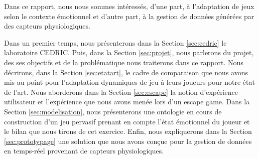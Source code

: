 \documentclass{article}
\begin{document}
	Dans ce rapport, nous nous sommes intéressés, d'une part, à l'adaptation de jeux selon le contexte émotionnel et d'autre part, à la gestion de données générées par des capteurs physiologiques.\par
	Dans un premier temps, nous présenterons dans la Section \ref{sec:cedric} le laboratoire CEDRIC.
	Puis, dans la Section \ref{sec:projet}, nous parlerons du projet, des ses objectifs et de la problématique nous traiterons dans ce rapport.
	Nous décrirons, dans la Section \ref{sec:etatart}, le cadre de comparaison que nous avons mis au point pour l'adaptation dynamiques de jeu à leurs joueurs pour notre état de l'art. 
	Nous aborderons dans la Section \ref{sec:escape} la notion d'expérience utilisateur et l'expérience que nous avons menée lors d'un escape game.
	Dans la Section \ref{sec:modelisation}, nous présenterons une ontologie en cours de construction d'un jeu pervasif prenant en compte l'état émotionnel du joueur et le bilan que nous tirons de cet exercice.
	Enfin, nous expliquerons dans la Section \ref{sec:prototypage} une solution que nous avons conçue pour la gestion de données en temps-réel provenant de capteurs physiologiques.
\end{document}
